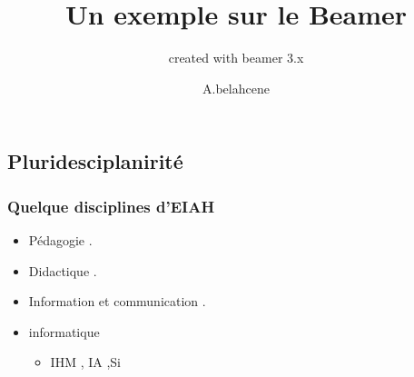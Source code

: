 \documentclass[9pt]{beamer}
\title[monExemple]{Un exemple sur le Beamer}
\subtitle{created with beamer 3.x}
\author[bela]{A.belahcene}
\institute{ IAP, Boumerdes}
\begin{document}
   

\subsection{Pluridesciplanirité }

\begin{frame}
    \frametitle{Quelque disciplines d'EIAH}
    \begin{itemize}[<+->]
        \item Pédagogie .
        \item Didactique .
        \item Information et communication .
        \item informatique 
        \begin{itemize}
            \item IHM , IA ,Si
        \end{itemize}
    \end{itemize}
\end{frame}
\end{document}

